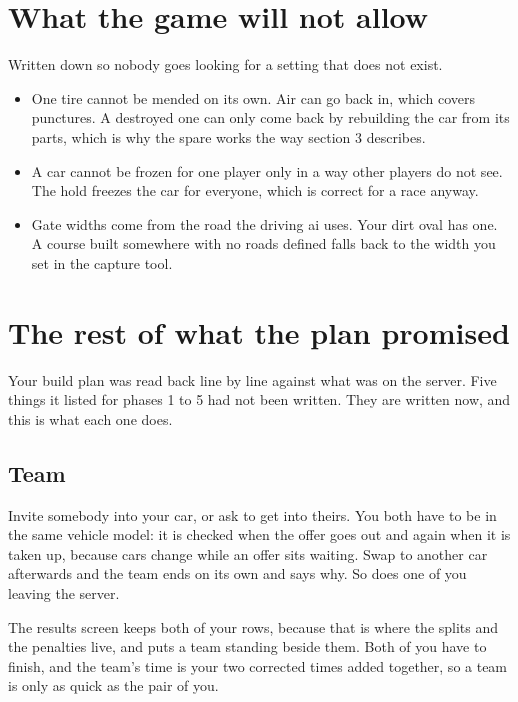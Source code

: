 \documentclass[11pt,a4paper]{article}
\begin{document}
\section{What the game will not allow}

Written down so nobody goes looking for a setting that does not exist.

\begin{itemize}
  \item One tire cannot be mended on its own. Air can go back in, which covers
        punctures. A destroyed one can only come back by rebuilding the car
        from its parts, which is why the spare works the way section 3
        describes.
  \item A car cannot be frozen for one player only in a way other players do
        not see. The hold freezes the car for everyone, which is correct for
        a race anyway.
  \item Gate widths come from the road the driving ai uses. Your dirt oval has
        one. A course built somewhere with no roads defined falls back to the
        width you set in the capture tool.
\end{itemize}

\section{The rest of what the plan promised}

Your build plan was read back line by line against what was on the server.
Five things it listed for phases 1 to 5 had not been written. They are written
now, and this is what each one does.

\subsection*{Team}

Invite somebody into your car, or ask to get into theirs. You both have to be
in the same vehicle model: it is checked when the offer goes out and again when
it is taken up, because cars change while an offer sits waiting. Swap to
another car afterwards and the team ends on its own and says why. So does one
of you leaving the server.

The results screen keeps both of your rows, because that is where the splits
and the penalties live, and puts a team standing beside them. Both of you have
to finish, and the team's time is your two corrected times added together, so a
team is only as quick as the pair of you.
\end{document}
